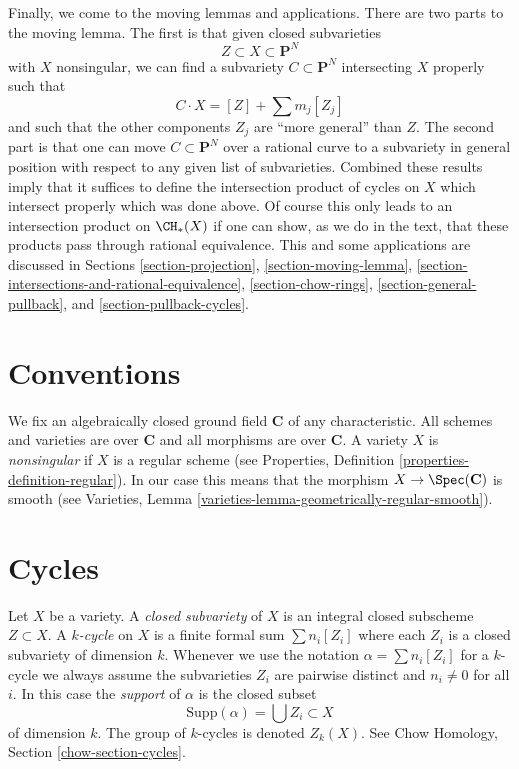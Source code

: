 \medskip\noindent
Finally, we come to the moving lemmas and applications. There are two
parts to the moving lemma. The first is that given closed subvarieties
$$
Z \subset X \subset \mathbf{P}^N
$$
with $X$ nonsingular, we can find a subvariety $C \subset \mathbf{P}^N$
intersecting $X$ properly such that
$$
C \cdot X = [Z] + \sum m_j [Z_j]
$$
and such that the other components $Z_j$ are ``more general'' than $Z$.
The second part is that one can move $C \subset \mathbf{P}^N$ over
a rational curve to a subvariety in general position with respect to
any given list of subvarieties. Combined these results imply that it suffices
to define the intersection product of cycles on $X$ which intersect
properly which was done above. Of course this only leads to an intersection
product on $\CH_*(X)$ if one can show, as we do in the text, that these products
pass through rational equivalence. This and some applications are discussed 
in Sections
\ref{section-projection},
\ref{section-moving-lemma},
\ref{section-intersections-and-rational-equivalence},
\ref{section-chow-rings},
\ref{section-general-pullback}, and
\ref{section-pullback-cycles}.



\section{Conventions}
\label{section-conventions}

\noindent
We fix an algebraically closed ground field $\mathbf{C}$ of any
characteristic. All schemes and varieties are over $\mathbf{C}$ and all
morphisms are over $\mathbf{C}$. A variety $X$ is
{\it nonsingular} if $X$ is a regular scheme (see
Properties, Definition \ref{properties-definition-regular}).
In our case this means that the morphism $X \to \Spec(\mathbf{C})$
is smooth (see
Varieties, Lemma \ref{varieties-lemma-geometrically-regular-smooth}).


\section{Cycles}
\label{section-cycles}

\noindent
Let $X$ be a variety. A {\it closed subvariety} of $X$ is an integral
closed subscheme $Z \subset X$. A {\it $k$-cycle} on $X$ is a finite
formal sum $\sum n_i [Z_i]$ where each $Z_i$ is a closed subvariety
of dimension $k$. Whenever we use the notation $\alpha = \sum n_i[Z_i]$
for a $k$-cycle we always assume the subvarieties $Z_i$ are pairwise
distinct and $n_i \not = 0$ for all $i$. In this case the
{\it support} of $\alpha$ is the closed subset
$$
\text{Supp}(\alpha) = \bigcup Z_i \subset X
$$
of dimension $k$. The group of $k$-cycles is denoted $Z_k(X)$.
See Chow Homology, Section \ref{chow-section-cycles}.


